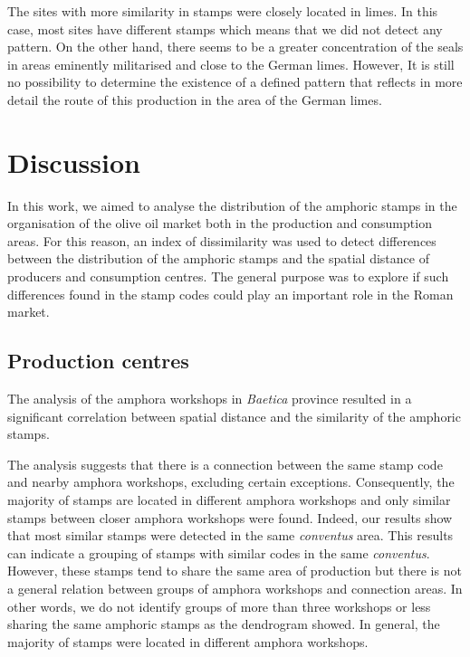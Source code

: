 \documentclass[review]{elsarticle}
\begin{document}
The sites with more similarity in stamps were closely located in limes. In this case, most sites have different stamps which means that we did not detect any pattern. On the other hand, there seems to be a greater concentration of the seals in areas eminently militarised and close to the German limes. However, It is still no possibility to determine the existence of a defined pattern that reflects in more detail the route of this production in the area of the German limes.


\section{Discussion}


In this work, we aimed to analyse the distribution of the amphoric stamps in the organisation of the olive oil market both in the production and consumption areas. For this reason, an index of dissimilarity was used to detect differences between the distribution of the amphoric stamps and the spatial distance of producers and consumption centres. The general purpose was to explore if such differences found in the stamp codes could play an important role in the Roman market.  

\subsection{Production centres}

The analysis of the amphora workshops in \textit{Baetica} province resulted in a significant correlation between spatial distance and the similarity of the amphoric stamps. 

The analysis suggests that there is  a connection between the same stamp code and nearby amphora workshops, excluding certain exceptions. Consequently, the majority of stamps are located in different amphora workshops and only similar stamps between closer amphora workshops were found. Indeed, our results show that most similar stamps were detected in the same \textit{conventus} area. This results can indicate a grouping of stamps with similar codes in the same \textit{conventus}. However, these stamps tend to share the same area of production but there is not a general relation between groups of amphora workshops and connection areas. In other words, we do not identify groups of more than three workshops or less sharing the same amphoric stamps as the dendrogram showed. In general, the majority of stamps were located in different amphora workshops. 
\end{document}
